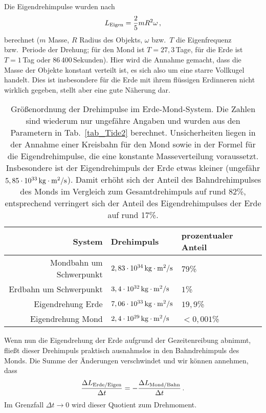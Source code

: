 Die Eigendrehimpulse wurden nach
\begin{equation}
\label{eq_Eigendrehimpuls}
             L_{\rm Eigen} = \frac{2}{5}  m R^2 \omega \, ,
\end{equation}
berechnet ($m$ Masse, $R$ Radius des Objekts, $\omega$ bzw.\ $T$ die Eigenfrequenz
bzw.\ Periode der Drehung; f\"ur den Mond ist $T=27,3$\,Tage, f\"ur die Erde ist $T=1$\,Tag oder
86\,400\,Sekunden). Hier wird die Annahme gemacht, dass die Masse der Objekte konstant 
verteilt ist, es sich also um eine starre Vollkugel handelt. Dies ist insbesondere f\"ur die Erde
mit ihrem fl\"ussigen Erdinneren nicht wirklich gegeben, stellt aber eine gute N\"aherung dar. 

\begin{table}[htb]
\begin{tabular}{r|l|l}
System & Drehimpuls & prozentualer Anteil \\ \hline
Mondbahn um Schwerpunkt & $ 2,83 \cdot 10^{34}\, {\rm kg\cdot m^2/s}$ & $79$\% \\  
Erdbahn um Schwerpunkt & $  3,4 \cdot 10^{32}\, {\rm kg\cdot m^2/s} $ & $1$\%\\ 
Eigendrehung Erde &  $ 7,06 \cdot 10^{33}\, {\rm kg\cdot m^2/s} $ & $19,9$\% \\
Eigendrehung Mond &  $ 2,4 \cdot 10^{29} \, {\rm kg\cdot m^2/s}  $ & $<0,001$\% \\
\end{tabular}
%
%
\caption{\label{tab_Drehimpuls}%
Gr\"o\ss enordnung der Drehimpulse im Erde-Mond-System. Die Zahlen sind wiederum nur
ungef\"ahre Angaben und wurden aus den Parametern in Tab.\ \ref{tab_Tide2} berechnet. 
Unsicherheiten liegen in der Annahme einer Kreisbahn f\"ur den
Mond sowie in der Formel f\"ur die Eigendrehimpulse, die eine konstante Masseverteilung
voraussetzt. Insbesondere ist der Eigendrehimpuls der Erde etwas kleiner (ungef\"ahr 
$5,85\cdot 10^{33}\, {\rm kg\cdot m^2/s}$). Damit erh\"oht sich der Anteil des Bahndrehimpulses des
Monds im Vergleich zum Gesamtdrehimpuls auf rund 82\%, entsprechend verringert
sich der Anteil des Eigendrehimpulses der Erde auf rund 17\%. 
}
\end{table}

Wenn nun die Eigendrehung der Erde aufgrund der Gezeitenreibung abnimmt, flie\ss t
dieser Drehimpuls praktisch ausnahmslos in den Bahndrehimpuls des Monds. Die Summe
der \"Anderungen verschwindet und wir k\"onnen
annehmen, dass
\begin{equation}
          \frac{\Delta L_{\rm Erde/Eigen}}{\Delta t} = -  \frac{\Delta L_{\rm Mond/Bahn}}{\Delta t}  \, .
\end{equation}
Im Grenzfall $\Delta t \rightarrow 0$ wird dieser Quotient zum Drehmoment. 


